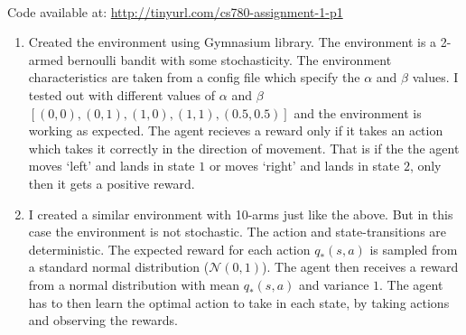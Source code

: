\\

\noindent Code available at: \url{http://tinyurl.com/cs780-assignment-1-p1}
\begin{enumerate}
    \item Created the environment using Gymnasium library. The environment is a 2-armed bernoulli bandit with some stochasticity. The environment characteristics are taken from a config file which specify the $\alpha$ and $\beta$ values. I tested out with different values of $\alpha$ and $\beta$ $[(0,0), (0,1), (1,0), (1,1), (0.5,0.5)]$ and the environment is working as expected. The agent recieves a reward only if it takes an action which takes it correctly in the direction of movement. That is if the the agent moves `left' and lands in state $1$ or moves `right' and lands in state $2$, only then it gets a positive reward. 
    
    \item I created a similar environment with 10-arms just like the above. But in this case the environment is not stochastic. The action and state-transitions are deterministic. The expected reward for each action $q_*(s, a)$ is sampled from a standard normal distribution ($\mathcal{N}(0, 1)$). The agent then receives a reward from a normal distribution with mean $q_*(s, a)$ and variance $1$. The agent has to then learn the optimal action to take in each state, by taking actions and observing the rewards.
    

\end{enumerate}
